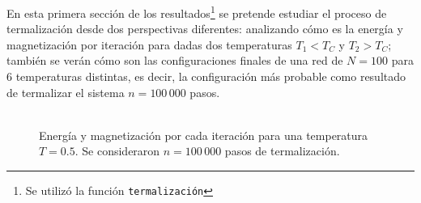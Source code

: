 \documentclass[11pt,a4paper]{article}
\begin{document}
En esta primera sección de los resultados\footnote{Se utilizó la función \texttt{termalización}} se pretende estudiar el proceso de termalización desde dos perspectivas diferentes: analizando cómo es la energía y magnetización por iteración para dadas dos temperaturas $T_1<T_C$ y $T_2>T_C$; también se verán cómo son las configuraciones finales de una red de $N=100$ para 6 temperaturas distintas, es decir, la configuración más probable como resultado de termalizar el sistema $n=100\, 000$ pasos.\\
\\
\begin{figure}[h!]
\centering
\caption{Energía y magnetización por cada iteración para una temperatura $T=0.5$. Se consideraron $n=100\, 000$ pasos de termalización.}	
\label{fig:EM05}
\end{figure}
\end{document}
